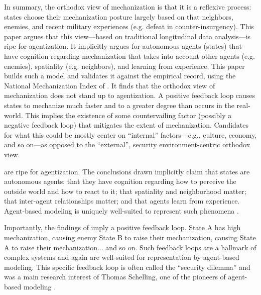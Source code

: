 \documentclass{article}
\begin{document}
\newpage

\printbibliography[heading=bibnumbered]

In summary, the orthodox view of mechanization is that it is a
reflexive process: states choose their mechanization posture largely based on
that neighbors, enemies, and recent military experiences (e.g. defeat in
counter-insurgency). This paper argues
that this view---based on traditional longitudinal data analysis---is ripe for
agentization. It implicitly argues for autonomous agents (states) that have
cognition regarding mechanization that takes into account other agents (e.g.
enemies), spatiality (e.g. neighbors), and learning from experience. This paper
builds such a model and validates it against the empirical record, using the
National Mechanization Index of \citet{sechser2010army}. It finds that the 
orthodox view of mechanization does not stand up to agentization. A positive feedback loop 
causes states to
mechanize much faster and to a greater degree than occurs in the real-world.
This implies the existence of some countervailing factor (possibly a negative
feedback loop) that mitigates the extent of mechanization. Candidates for what
this could be mostly center on ``internal'' factors---e.g., culture, economy,
and so on---as opposed to the ``external'', security environment-centric
orthodox view.

are ripe for agentization. The
conclusions drawn implicitly claim
that states are autonomous agents; that they have
cognition regarding how to perceive the outside world
and how to react to it; that spatiality and
neighborhood matter; that inter-agent relationships matter; and that
agents learn from experience. Agent-based modeling is uniquely well-suited to
represent such phenomena .

Importantly, the findings of \citet{sechser2010army} imply a positive feedback
loop. State A has high
mechanization, causing enemy State B to raise their mechanization, causing State
A to raise their mechanization... and so on. Such feedback loops are a hallmark
of complex systems and again are well-suited for representation by agent-based
modeling. This specific feedback loop is often called
the ``security dilemma'' and was a main research interest of Thomas Schelling, one of the pioneers
of agent-based modeling \citep{schelling1960strategy,schelling2006micromotives}.
\end{document}
